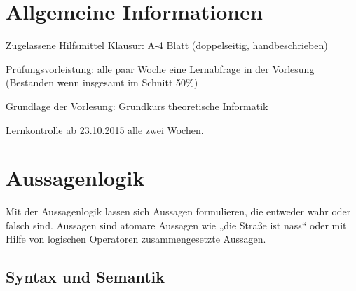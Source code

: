 \newcommand{\customDir}{../}











\maketitle
\newpage
\tableofcontents
\newpage

\chapter*{Allgemeine Informationen}

Zugelassene Hilfsmittel Klausur: A-4 Blatt (doppelseitig, handbeschrieben)

Prüfungsvorleistung: alle paar Woche eine Lernabfrage in der Vorlesung (Bestanden wenn insgesamt im Schnitt 50\%)

Grundlage der Vorlesung: Grundkurs theoretische Informatik \cite{hollas2007grundkurs}

Lernkontrolle ab 23.10.2015 alle zwei Wochen.

\chapter{Aussagenlogik}

Mit der Aussagenlogik lassen sich Aussagen formulieren, die entweder wahr oder falsch sind. Aussagen sind atomare Aussagen wie „die Straße ist nass“ oder mit Hilfe von logischen Operatoren zusammengesetzte Aussagen.

\section{Syntax und Semantik}

